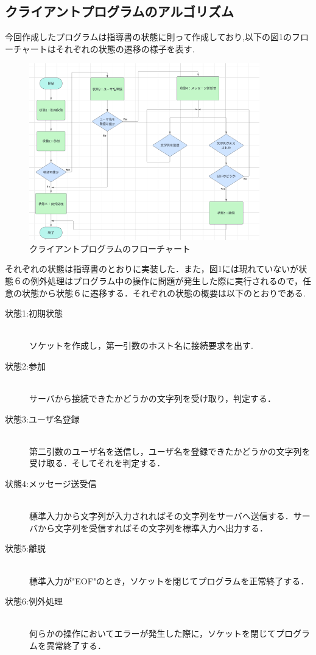 \documentclass[dvipdfmx]{jarticle}
\begin{document}
\subsection{クライアントプログラムのアルゴリズム}
今回作成したプログラムは指導書の状態に則って作成しており,以下の図1のフローチャートはそれぞれの状態の遷移の様子を表す.
\clearpage
\begin{figure}[h]
    \centering
    \includegraphics[width=10cm]{4-1clienthurotya.png}
    \caption{クライアントプログラムのフローチャート}
\end{figure}
それぞれの状態は指導書のとおりに実装した．また，図1には現れていないが状態６の例外処理はプログラム中の操作に問題が発生した際に実行されるので，任意の状態から状態６に遷移する．それぞれの状態の概要は以下のとおりである.
\begin{description}
    \item[状態1:初期状態] 　\\  ソケットを作成し，第一引数のホスト名に接続要求を出す.
    \item[状態2:参加]　\\ サーバから接続できたかどうかの文字列を受け取り，判定する．
    \item[状態3:ユーザ名登録]　\\ 第二引数のユーザ名を送信し，ユーザ名を登録できたかどうかの文字列を受け取る．そしてそれを判定する．
    \item[状態4:メッセージ送受信]　\\ 標準入力から文字列が入力されればその文字列をサーバへ送信する．サーバから文字列を受信すればその文字列を標準入力へ出力する．
    \item[状態5:離脱]　\\ 標準入力が"EOF"のとき，ソケットを閉じてプログラムを正常終了する．
    \item[状態6:例外処理]　\\ 何らかの操作においてエラーが発生した際に，ソケットを閉じてプログラムを異常終了する．
\end{description}
\end{document}
